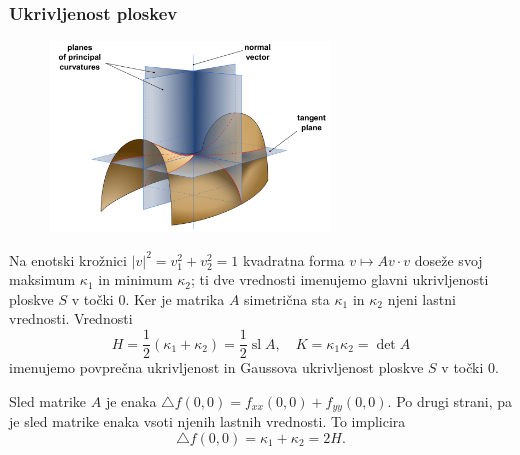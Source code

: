\documentclass[8pt]{beamer}
\theoremstyle{definition}
\theoremstyle{remark}
\theoremstyle{plain}
\numberwithin{equation}{section}  %
\begin{document}
\begin{frame}
    \frametitle{Ukrivljenost ploskev}

    \begin{figure}
        \includegraphics[width=20em]{../Slike/Minimal_surface_curvature_planes.pdf}
    \end{figure}

    Na enotski krožnici $|v|^2=v_1^2+v_2^2=1$ kvadratna forma $v \mapsto A v \cdot v$ doseže svoj maksimum $\kappa_1$ in minimum $\kappa_2$; ti dve vrednosti imenujemo \textcolor{red1}{glavni ukrivljenosti} ploskve $S$ v točki $0$. Ker je matrika $A$ simetrična sta $\kappa_1$ in $\kappa_2$ njeni lastni vrednosti. Vrednosti 
    \begin{equation*}
        H=\frac{1}{2}(\kappa_1+\kappa_2)=\frac{1}{2}\operatorname{sl} A, \quad K=\kappa_1 \kappa_2=\operatorname{det} A
    \end{equation*}
    imenujemo \textcolor{red1}{povprečna ukrivljenost} in \textcolor{red1}{Gaussova ukrivljenost} ploskve $S$ v točki $0$. 

    \vspace{0.8em}

    Sled matrike $A$ je enaka $\bigtriangleup f(0,0)=f_{x x}(0,0)+f_{y y}(0,0)$. Po drugi strani, pa je sled matrike enaka vsoti njenih lastnih vrednosti. To implicira 
    \begin{equation*}
        \bigtriangleup f(0,0)=\kappa_1+\kappa_2=2H.
    \end{equation*}

\end{frame}
\end{document}
